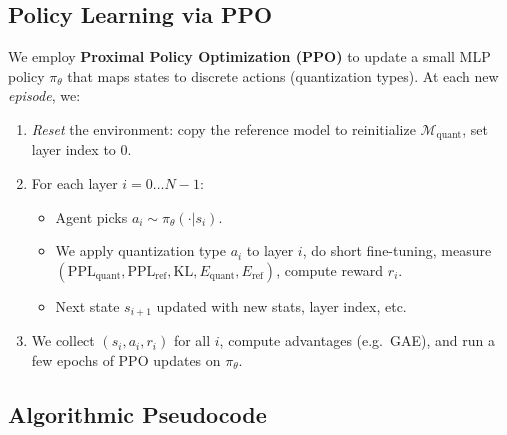\documentclass{article}
\begin{document}
	\subsection{Policy Learning via PPO}
	We employ \textbf{Proximal Policy Optimization (PPO)} \cite{ppo2017} to update a small MLP policy $\pi_\theta$ that maps states to discrete actions (quantization types). At each new \emph{episode}, we:
	\begin{enumerate}
		\item \emph{Reset} the environment: copy the reference model to reinitialize $\mathcal{M}_\text{quant}$, set layer index to 0.
		\item For each layer $i=0 \dots N-1$:
		\begin{itemize}
			\item Agent picks $a_i \sim \pi_\theta(\cdot|s_i)$.
			\item We apply quantization type $a_i$ to layer $i$, do short fine-tuning, measure $(\mathrm{PPL}_\text{quant}, \mathrm{PPL}_\text{ref}, \mathrm{KL}, E_\text{quant}, E_\text{ref})$, compute reward $r_i$.
			\item Next state $s_{i+1}$ updated with new stats, layer index, etc.
		\end{itemize}
		\item We collect $(s_i,a_i,r_i)$ for all $i$, compute advantages (e.g.\ GAE), and run a few epochs of PPO updates on $\pi_\theta$.
	\end{enumerate}
	
	\vspace{-0.75em}
	\subsection{Algorithmic Pseudocode}
	\label{subsec:pseudocode}
	\vspace{-0.25em}
	
\end{document}

